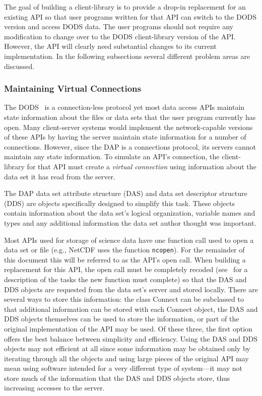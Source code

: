 The goal of building a client-library is to provide a drop-in replacement for
an existing API so that user programs written for that API can switch to the
DODS version and access DODS data. The user programs should not require any
modification to change over to the DODS client-library version of the
API. However, the API will clearly need substantial changes to its current
implementation. In the following subsections several different problem areas
are discussed. 

\subsubsection{Maintaining Virtual Connections}
\label{tk:virtual-connections}

The DODS \Dap\ is a connection-less protocol yet most data access APIs
maintain state information about the files or data sets that the user program
currently has open. Many client-server systems would implement the
network-capable versions of these APIs by having the server maintain state
information for a number of connections. However, since the DAP is a
connections protocol, its servers cannot maintain any state information. To
simulate an API's connection, the client-library for that API must create a
{\em virtual connection\/} using information about the data set it has read
from the server.

The DAP data set attribute structure (DAS) and data set descriptor structure
(DDS) are objects specifically designed to simplify this task. These objects
contain information about the data set's logical organization, variable names
and types and any additional information the data set author thought was
important. 

Most APIs used for storage of science data have one function call used to
open a data set or file (e.g., NetCDF uses the function {\tt ncopen}). For
the remainder of this document this will be referred to as the API's open
call. When building a replacement for this API, the open call must be
completely recoded (see \DDD\ for a description of the tasks the new function
must complete) so that the DAS and DDS objects are requested from the data
set's server and stored locally. There are several ways to store this
information: the class Connect can be subclassed to that additional
information can be stored with each Connect object, the DAS and DDS objects
themselves can be used to store the information, or part of the original
implementation of the API may be used. Of these three, the first option offers
the best balance between simplicity and efficiency. Using the DAS and DDS
objects may not efficient at all since some information may be obtained only
by iterating through all the objects and using large pieces of the original
API may mean using software intended for a very different type of system---it
may not store much of the information that the DAS and DDS objects store,
thus increasing accesses to the server.

